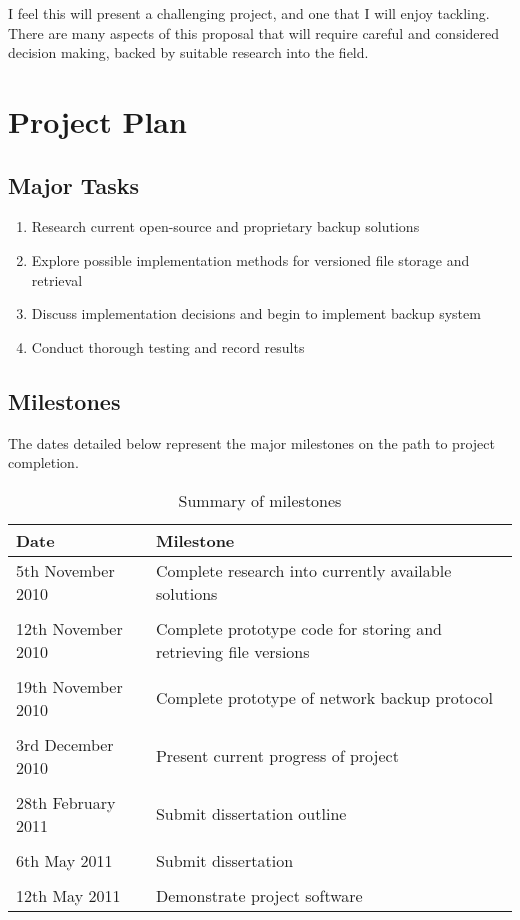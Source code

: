 \documentclass[a4paper]{article}
\begin{document}
    I feel this will present a challenging project, and one that I will enjoy
    tackling. There are many aspects of this proposal that will require careful
    and considered decision making, backed by suitable research into the field.

    \section{Project Plan}

    \subsection{Major Tasks}

    \begin{enumerate}
        \item Research current open-source and proprietary backup solutions
        \item Explore possible implementation methods for versioned file
            storage and retrieval
        \item Discuss implementation decisions and begin to implement backup
            system
        \item Conduct thorough testing and record results
    \end{enumerate}

    \subsection{Milestones}

    The dates detailed below represent the major milestones on the path to
    project completion.

    \begin{table}[H]
        \centering
        \begin{tabular}{ l | l }
            Date & Milestone \\ \hline

            5th November 2010   & Complete research into currently available
                                    solutions \\ \\
            12th November 2010  & Complete prototype code for storing and
                                    retrieving file versions \\ \\
            19th November 2010  & Complete prototype of network backup
                                    protocol \\ \\
            3rd December 2010   & Present current progress of project \\ \\
            28th February 2011  & Submit dissertation outline \\ \\
            6th May 2011        & Submit dissertation \\ \\
            12th May 2011       & Demonstrate project software \\
        \end{tabular}
        \caption{Summary of milestones}
    \end{table}
\end{document}
